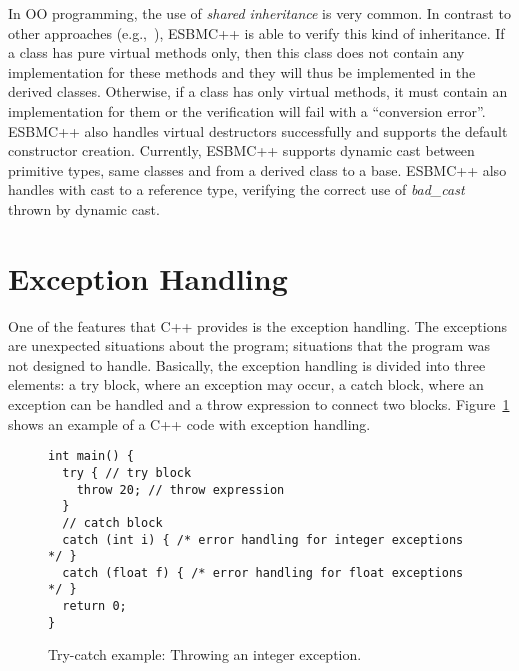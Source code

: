 \documentclass[a4paper]{llncs}
\begin{document}
In OO programming, the use of \textit{shared inheritance} is very common.
In contrast to other approaches (e.g.,~\cite{Blanc07}), ESBMC++ is able to
verify this kind of inheritance. If a class has pure virtual methods only,
then this class does not contain any implementation for these methods and they will
thus be implemented in the derived classes. Otherwise, if a class has only virtual
methods, it must contain an implementation for them or the verification will fail
with a ``conversion error''. ESBMC++ also handles virtual destructors successfully
and supports the default constructor creation. Currently, ESBMC++
supports dynamic cast between primitive types, same classes and from a derived
class to a base. ESBMC++ also handles with cast to a reference type, verifying the
correct use of \textit{bad\_cast} thrown by dynamic cast.

\section{Exception Handling}
\label{exception-handling}

One of the features that C++ provides is the exception handling.
The exceptions are unexpected situations about the program; situations
that the program was not designed to handle. Basically, the exception handling
is divided into three elements: a try block, where an
exception may occur, a catch block, where an exception can be handled and a throw
expression to connect two blocks.
Figure~\ref{figure:try-catch-example} shows an example
of a C++ code with exception handling.
%
\begin{figure}[ht]
\centering
\begin{minipage}{1.0\textwidth}
\begin{lstlisting}
int main() {
  try { // try block
    throw 20; // throw expression
  }
  // catch block
  catch (int i) { /* error handling for integer exceptions */ }
  catch (float f) { /* error handling for float exceptions */ }
  return 0;
}
\end{lstlisting}
\end{minipage}
\caption{Try-catch example: Throwing an integer exception.}
\label{figure:try-catch-example}
\end{figure}
\end{document}
